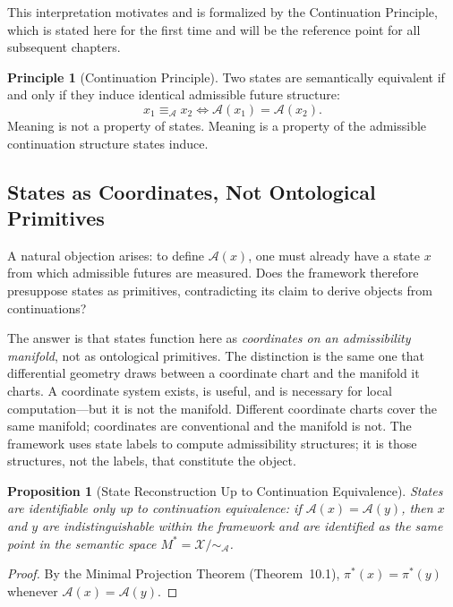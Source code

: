 \documentclass[12pt, oneside]{book}
\theoremstyle{flyxion}
\newtheorem{proposition}[theorem]{Proposition}
\theoremstyle{definition}
\newtheorem{principle}[theorem]{Principle}
\begin{document}
This interpretation motivates and is formalized by the Continuation
Principle, which is stated here for the first time and will be the
reference point for all subsequent chapters.

\begin{principle}[Continuation Principle]
\label{prin:continuation}
Two states are semantically equivalent if and only if they induce
identical admissible future structure:
\[
x_1 \equiv_{\mathcal{A}} x_2 \iff \mathcal{A}(x_1) = \mathcal{A}(x_2).
\]
Meaning is not a property of states. Meaning is a property of the
admissible continuation structure states induce.
\end{principle}

\subsection*{States as Coordinates, Not Ontological Primitives}

A natural objection arises: to define $\mathcal{A}(x)$, one must
already have a state $x$ from which admissible futures are measured.
Does the framework therefore presuppose states as primitives,
contradicting its claim to derive objects from continuations?

The answer is that states function here as \emph{coordinates on an
admissibility manifold}, not as ontological primitives. The distinction
is the same one that differential geometry draws between a coordinate
chart and the manifold it charts. A coordinate system exists, is
useful, and is necessary for local computation---but it is not the
manifold. Different coordinate charts cover the same manifold;
coordinates are conventional and the manifold is not. The framework
uses state labels to compute admissibility structures; it is those
structures, not the labels, that constitute the object.

\begin{proposition}[State Reconstruction Up to Continuation
Equivalence]
\label{prop:state_recon}
States are identifiable only up to continuation equivalence: if
$\mathcal{A}(x) = \mathcal{A}(y)$, then $x$ and $y$ are
indistinguishable within the framework and are identified as the same
point in the semantic space $M^* = \mathcal{X}/{\sim_{\mathcal{A}}}$.
\end{proposition}

\begin{proof}
By the Minimal Projection Theorem (Theorem~10.1), $\pi^*(x) =
\pi^*(y)$ whenever $\mathcal{A}(x) = \mathcal{A}(y)$.
\end{proof}
\end{document}
